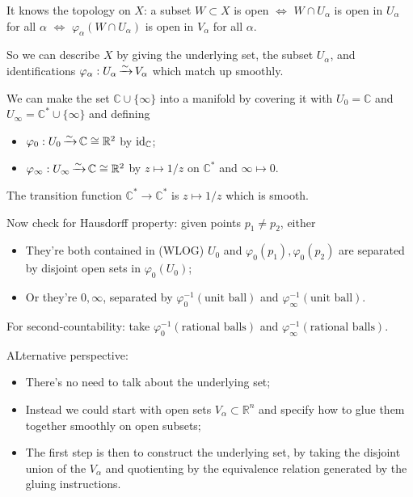 \documentclass[a4paper,11pt]{article}
\begin{document}
	It knows the topology on $X$: a subset $W \subset X$ is open $\Leftrightarrow$ $W \cap U_\alpha$ is open in $U_\alpha$ for all $\alpha$ $\Leftrightarrow$ $\varphi_\alpha(W\cap U_\alpha)$ is open in $V_\alpha$ for all $\alpha$.

	So we can describe $X$ by giving the underlying set, the subset $U_\alpha$, and identifications $\varphi_\alpha: U_\alpha \operatorname{\xrightarrow{\sim}} V_\alpha$ which match up smoothly.

	\begin{ex}
		We can make the set $\mathbb{C}\cup \{\infty\}$ into a manifold by covering it with $U_0 = \mathbb{C}$ and $U_\infty = \mathbb{C}^* \cup \{\infty\}$ and defining
		\begin{itemize}
			\item $\varphi_0 : U_0 \operatorname{\xrightarrow{\sim}} \mathbb{C} \cong \mathbb{R}^2$ by $\operatorname{id}_{\mathbb{C}}$;
			\item $\varphi_{\infty}: U_\infty \operatorname{\xrightarrow{\sim}} \mathbb{C} \cong \mathbb{R}^2$ by $z \mapsto 1/z$ on $\mathbb{C}^*$ and $\infty \mapsto 0$. 
		\end{itemize}
		The transition function $\mathbb{C}^* \to \mathbb{C}^*$ is $z \mapsto 1/z$ which is smooth.


		Now check for Hausdorff property: given points $p_1 \neq p_2$, either
		\begin{itemize}
			\item They're both contained in (WLOG) $U_0$ and $\varphi_0 (p_1), \varphi_0(p_2)$ are separated by disjoint open sets in $\varphi_0 (U_0)$;
			\item Or they're $0, \infty$, separated by $\varphi_0^{-1}(\text{unit ball})$ and $\varphi_\infty^{-1}(\text{unit ball})$.
		\end{itemize}

		For second-countability: take $\varphi_0^{-1}(\text{rational balls})$ and $\varphi_\infty^{-1}(\text{rational balls})$.
	\end{ex}

	ALternative perspective:
	\begin{itemize}
		\item There's no need to talk about the underlying set;
		\item Instead we could start with open sets $V_\alpha \subset \mathbb{R}^n$ and specify how to glue them together smoothly on open subsets;
		\item The first step is then to construct the underlying set, by taking the disjoint union of the $V_\alpha$ and quotienting by the equivalence relation generated by the gluing instructions.
	\end{itemize}
\end{document}
